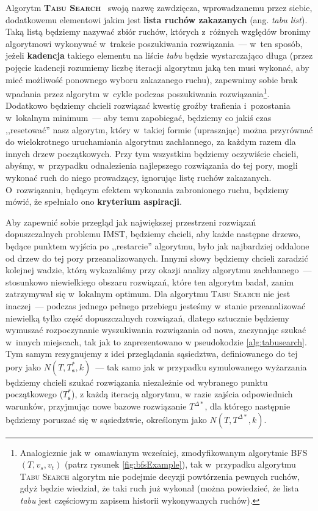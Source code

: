 Algorytm \textsc{\textbf{Tabu Search}}~\cite{TabuSearch} swoją nazwę zawdzięcza, wprowadzanemu przez siebie, dodatkowemu elementowi jakim jest \textbf{lista ruchów zakazanych} (ang. \textit{tabu list}).
Taką listą będziemy nazywać zbiór ruchów, których z~różnych względów bronimy algorytmowi wykonywać w~trakcie poszukiwania rozwiązania~--- w~ten sposób, jeżeli \textbf{kadencja} takiego elementu na liście \textit{tabu} będzie wystarczająco długa (przez pojęcie kadencji rozumiemy liczbę iteracji algorytmu jaką ten musi wykonać, aby mieć możliwość ponownego wyboru zakazanego ruchu), zapewnimy sobie brak wpadania przez algorytm w~cykle podczas poszukiwania rozwiązania\footnote{
	Analogicznie jak w~omawianym wcześniej, zmodyfikowanym algorytmie \textsc{BFS} $\left( T, v_{s}, v_{t} \right)$ (patrz rysunek \ref{fig:bfsExample}), tak w~przypadku algorytmu \textsc{Tabu Search} algorytm nie podejmie decyzji powtórzenia pewnych ruchów, gdyż będzie wiedział, że taki ruch już wykonał (można powiedzieć, że lista \textit{tabu} jest częściowym zapisem historii wykonywanych ruchów).
}.
Dodatkowo będziemy chcieli rozwiązać kwestię groźby trafienia i~pozostania w~lokalnym minimum~--- aby temu zapobiegać, będziemy co jakiś czas ,,resetować'' nasz algorytm, który w~takiej formie (upraszając) można przyrównać do wielokrotnego uruchamiania algorytmu zachłannego, za każdym razem dla innych drzew początkowych.
Przy tym wszystkim będziemy oczywiście chcieli, abyśmy, w~przypadku odnalezienia najlepszego rozwiązania do tej pory, mogli wykonać ruch do niego prowadzący, ignorując listę ruchów zakazanych.
O~rozwiązaniu, będącym efektem wykonania zabronionego ruchu, będziemy mówić, że spełniało ono \textbf{kryterium aspiracji}.

Aby zapewnić sobie przegląd jak największej przestrzeni rozwiązań dopuszczalnych problemu \textsc{IMST}, będziemy chcieli, aby każde następne drzewo, będące punktem wyjścia po ,,restarcie'' algorytmu, było jak najbardziej oddalone od drzew do tej pory przeanalizowanych.
Innymi słowy będziemy chcieli zaradzić kolejnej wadzie, którą wykazaliśmy przy okazji analizy algorytmu zachłannego~--- stosunkowo niewielkiego obszaru rozwiązań, które ten algorytm badał, zanim zatrzymywał się w~lokalnym optimum.
Dla algorytmu \textsc{Tabu Search} nie jest inaczej~--- podczas jednego pełnego przebiegu jesteśmy w~stanie przeanalizować niewielką tylko część dopuszczalnych rozwiązań, dlatego sztucznie będziemy wymuszać rozpoczynanie wyszukiwania rozwiązania od nowa, zaczynając szukać w~innych miejscach, tak jak to zaprezentowano w pseudokodzie \ref{alg:tabusearch}.
Tym samym rezygnujemy z idei przeglądania sąsiedztwa, definiowanego do tej pory jako $N \left( T, T^{\ast}_{\textbf{s}}, k \right)$~--- tak samo jak w przypadku symulowanego wyżarzania będziemy chcieli szukać rozwiązania niezależnie od wybranego punktu początkowego ($T^{\ast}_{\textbf{s}}$), z każdą iteracją algorytmu, w razie zajścia odpowiednich warunków, przyjmując nowe bazowe rozwiązanie $T^{\Delta\ast}$, dla którego następnie będziemy poruszać się w sąsiedztwie, określonym jako $N \left( T, T^{\Delta\ast}, k \right)$.



